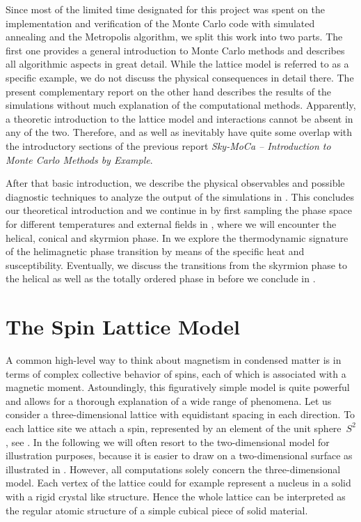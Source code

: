 Since most of the limited time designated for this project was spent on the
implementation and verification of the Monte Carlo code with simulated annealing
and the Metropolis algorithm, we split this work into two parts. The first one
provides a general introduction to Monte Carlo methods and describes all
algorithmic aspects in great detail. While the lattice model is referred to as
a specific example, we do not discuss the physical consequences in detail there.
The present complementary report on the other hand describes the results of the
simulations without much explanation of the computational methods. Apparently, a
theoretic introduction to the lattice model and interactions cannot be absent in
any of the two. Therefore,  and  as
well as  inevitably have quite some overlap with the
introductory sections of the previous report \emph{Sky-MoCa -- Introduction to
Monte Carlo Methods by Example}.

After that basic introduction, we describe the physical observables and possible
diagnostic techniques to analyze the output of the simulations in
. This concludes our theoretical introduction and we
continue in  by first sampling the phase space for different
temperatures and external fields in , where we will encounter
the helical, conical and skyrmion phase. In  we explore the
thermodynamic signature of the helimagnetic phase transition by means of the
specific heat and susceptibility. Eventually, we discuss the transitions from
the skyrmion phase to the helical as well as the totally ordered phase in
 before we conclude in .
%
\section{The Spin Lattice Model}\label{sec:lattice}
%
A common high-level way to think about magnetism in condensed matter is in terms
of complex collective behavior of spins, each of which is associated with a
magnetic moment. Astoundingly, this figuratively simple model is quite powerful
and allows for a thorough explanation of a wide range of phenomena. Let us
consider a three-dimensional lattice with equidistant spacing in each direction.
To each lattice site we attach a spin, represented by an element of the unit
sphere~$S^2$, see . In the following we will often resort to the
two-dimensional model for illustration purposes, because it is easier to draw on
a two-dimensional surface as illustrated in . However, all
computations solely concern the three-dimensional model. Each vertex of the
lattice could for example represent a nucleus in a solid with a rigid crystal
like structure. Hence the whole lattice can be interpreted as the regular atomic
structure of a simple cubical piece of solid material.

